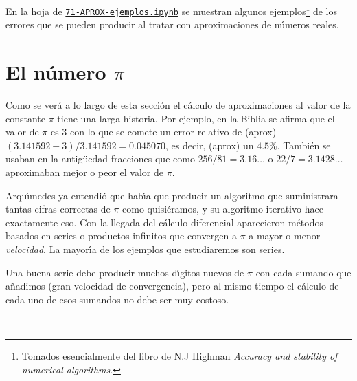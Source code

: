 En la hoja de {\sage} \href{http://localhost:8888/notebooks/APROX/71-APROX-ejemplos.ipynb}{\tt 71-APROX-ejemplos.ipynb}
 se muestran algunos ejemplos\footnote{Tomados
esencialmente del libro de N.J Highman {\itshape Accuracy and stability of
numerical algorithms}.} de los errores que se pueden producir al tratar con
aproximaciones de n\'umeros reales.





\section{El n\'umero $\pi$}


Como se ver\'a a lo largo de esta secci\'on  el c\'alculo de aproximaciones al
valor de la constante $\pi$ tiene 
una larga historia. Por ejemplo, en la Biblia se afirma que el valor de $\pi$ es
 $3$ con lo que se comete un error relativo de (aprox)
$(3{.}141592-3)/3{.}141592=0{.}045070$, es decir, (aprox) un $4{.}5\%.$
Tambi\'en se usaban en la antig\"uedad fracciones 
que como $256/81=3{.}16\dots$ o $22/7=3{.}1428\dots$  aproximaban mejor o peor
el valor de $\pi$.


Arqu\'{\i}medes ya entendi\'o que hab\'{\i}a que producir un algoritmo que
suministrara tantas cifras correctas de $\pi$ como quisiéramos, y su algoritmo
iterativo hace exactamente eso. Con la llegada del c\'alculo diferencial 
aparecieron m\'etodos basados en series o productos infinitos que convergen a
$\pi$ a mayor o menor {\itshape velocidad}. La mayor\'{\i}a de los ejemplos
que estudiaremos son series.

Una buena serie debe producir muchos d\'{\i}gitos nuevos de $\pi$ con cada
sumando que a\~nadimos (gran velocidad de convergencia), pero al mismo tiempo el
c\'alculo de cada uno de esos sumandos no debe ser muy costoso. 

\

